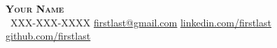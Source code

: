 \begin{center}
    \textbf{\Huge \scshape Your Name} \\ \vspace{1pt}
     \ \small XXX-XXX-XXXX \quad
    \href{mailto:firstlast@gmail.com}{ \underline{firstlast@gmail.com}} \quad
    \href{https://www.linkedin.com/in/}{ \underline{linkedin.com/firstlast}} \quad
    \href{https://github.com/}{ \underline{github.com/firstlast}}
\end{center}
